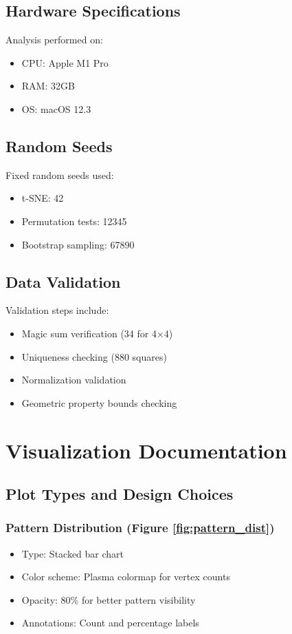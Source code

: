 \documentclass[11pt]{article}
\begin{document}
\subsection{Hardware Specifications}
Analysis performed on:
\begin{itemize}
    \item CPU: Apple M1 Pro
    \item RAM: 32GB
    \item OS: macOS 12.3
\end{itemize}

\subsection{Random Seeds}
Fixed random seeds used:
\begin{itemize}
    \item t-SNE: 42
    \item Permutation tests: 12345
    \item Bootstrap sampling: 67890
\end{itemize}

\subsection{Data Validation}
Validation steps include:
\begin{itemize}
    \item Magic sum verification (34 for 4×4)
    \item Uniqueness checking (880 squares)
    \item Normalization validation
    \item Geometric property bounds checking
\end{itemize}

\section{Visualization Documentation}
\label{sec:visualization}

\subsection{Plot Types and Design Choices}

\subsubsection{Pattern Distribution (Figure \ref{fig:pattern_dist})}
\begin{itemize}
    \item Type: Stacked bar chart
    \item Color scheme: Plasma colormap for vertex counts
    \item Opacity: 80\% for better pattern visibility
    \item Annotations: Count and percentage labels
\end{itemize}
\end{document}
